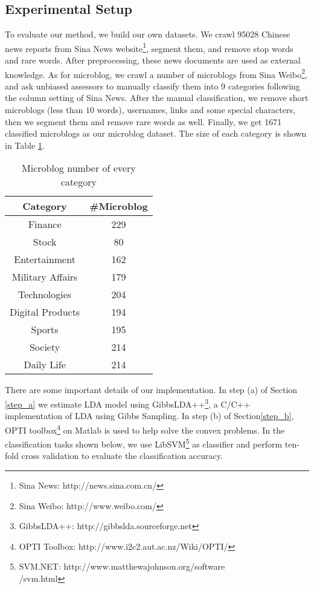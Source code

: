 \documentclass[11pt]{article}
\begin{document}
\subsection{Experimental Setup}

To evaluate our method, we build our own datasets. We crawl 95028 Chinese news reports from Sina News website\footnote{Sina News: http://news.sina.com.cn/}, segment them, and remove stop words and rare words. After preprocessing, these news documents are used as external knowledge. As for microblog, we crawl a number of microblogs from Sina Weibo\footnote{Sina Weibo: http://www.weibo.com/}, and ask unbiased assessors to manually classify them into 9 categories following the column setting of Sina News. After the manual classification, we remove short microblogs (less than $10$ words), usernames, links and some special characters, then we segment them and remove rare words as well. Finally, we get 1671 classified microblogs as our microblog dataset. The size of each category is shown in Table \ref{category}.

\begin{table}[h]
\begin{center}
\begin{tabular}{|c|c|}
\hline \bf Category & \bf \#Microblog \\ \hline
Finance &  229 \\
Stock & 80\\
Entertainment & 162 \\
Military Affairs & 179 \\
Technologies & 204 \\
Digital Products & 194 \\
Sports & 195 \\
Society & 214 \\
Daily Life & 214 \\
\hline
\end{tabular}
\end{center}
\caption{Microblog number of every category}\label{category}
\end{table}

There are some important details of our implementation. In step (a) of Section \ref{step_a} we estimate LDA model using GibbsLDA++\footnote{GibbsLDA++: http://gibbslda.sourceforge.net}, a C/C++ implementation of LDA using Gibbs Sampling. In step (b) of Section\ref{step_b}, OPTI toolbox\footnote{OPTI Toolbox: http://www.i2c2.aut.ac.nz/Wiki/OPTI/} on Matlab is used to help solve the convex problems. In the classification tasks shown below, we use LibSVM\footnote{SVM.NET: http://www.matthewajohnson.org/software\\/svm.html} as classifier and perform ten-fold cross validation to evaluate the classification accuracy.
\end{document}
